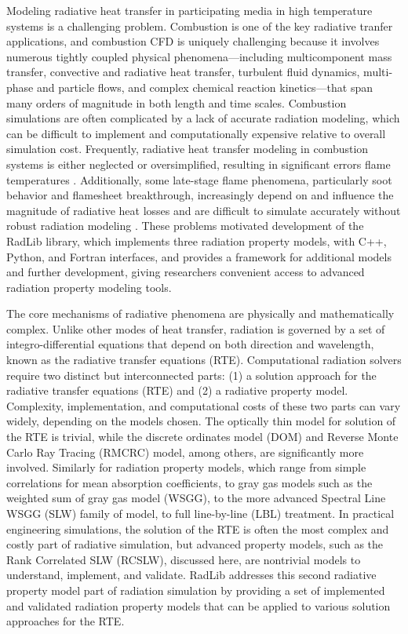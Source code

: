\documentclass[preprint,12pt]{elsarticle}
\begin{document}
Modeling radiative heat transfer in participating media in high temperature systems is a challenging problem. Combustion is one of the key radiative tranfer applications, and combustion CFD is uniquely challenging because it involves numerous tightly coupled physical phenomena---including multicomponent mass transfer, convective and radiative heat transfer, turbulent fluid dynamics, multi-phase and particle flows, and complex chemical reaction kinetics---that span many orders of magnitude in both length and time scales. Combustion simulations are often complicated by a lack of accurate radiation modeling, which can be difficult to implement and computationally expensive relative to overall simulation cost. Frequently, radiative heat transfer modeling in combustion systems is either neglected or oversimplified, resulting in significant errors flame temperatures \citep{Modest_2016}. Additionally, some late-stage flame phenomena, particularly soot behavior and flamesheet breakthrough, increasingly depend on and influence the magnitude of radiative heat losses and are difficult to simulate accurately without robust radiation modeling \cite{Modest_2013}. These problems motivated development of the RadLib library, which implements three radiation property models, with C++, Python, and Fortran interfaces, and provides a framework for additional models and further development, giving researchers convenient access to advanced radiation property modeling tools. 

The core mechanisms of radiative phenomena are physically and mathematically complex. Unlike other modes of heat transfer, radiation is governed by a set of integro-differential equations that depend on both direction and wavelength, known as the radiative transfer equations (RTE). Computational radiation solvers require two distinct but interconnected parts: (1) a solution approach for the radiative transfer equations (RTE) and (2) a radiative property model. 
Complexity, implementation, and computational costs of these two parts can vary widely, depending on the models chosen. The optically thin model for solution of the RTE is trivial, while the discrete ordinates model (DOM) and Reverse Monte Carlo Ray Tracing (RMCRC) model, among others, are significantly more involved. Similarly for radiation property models, which range from simple correlations for mean absorption coefficients, to gray gas models such as the weighted sum of gray gas model (WSGG), to the more advanced Spectral Line WSGG (SLW) family of model, to full line-by-line (LBL) treatment. In practical engineering simulations, the solution of the RTE is often the most complex and costly part of radiative simulation, but advanced property models, such as the Rank Correlated SLW (RCSLW), discussed here, are nontrivial models to understand, implement, and validate.
RadLib addresses this second radiative property model part of radiation simulation by providing a set of implemented and validated radiation property models that can be applied to various solution approaches for the RTE. 
\end{document}
